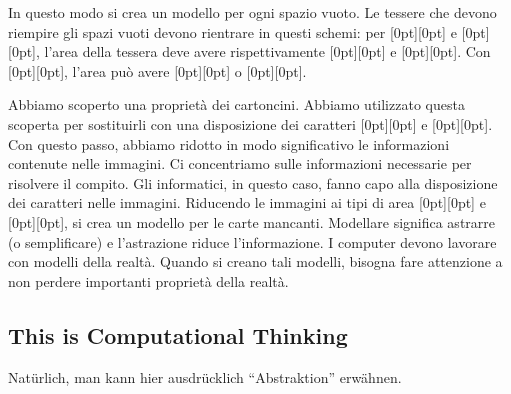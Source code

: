 \documentclass[a4paper,11pt]{report}
\newcommand{\taskGraphicsFolder}{..}
\begin{document}
In questo modo si crea un modello per ogni spazio vuoto. Le tessere che devono riempire gli spazi vuoti devono rientrare in questi schemi: per \raisebox{-0.5ex}[0pt][0pt]{} e \raisebox{-0.5ex}[0pt][0pt]{}, l’area della tessera deve avere rispettivamente \raisebox{-0.5ex}[0pt][0pt]{} e \raisebox{-0.5ex}[0pt][0pt]{}. Con \raisebox{-0.5ex}[0pt][0pt]{}, l’area può avere \raisebox{-0.5ex}[0pt][0pt]{} o \raisebox{-0.5ex}[0pt][0pt]{}.

Abbiamo scoperto una proprietà dei cartoncini. Abbiamo utilizzato questa scoperta per sostituirli con una disposizione dei caratteri \raisebox{-0.5ex}[0pt][0pt]{} e \raisebox{-0.5ex}[0pt][0pt]{}. Con questo passo, abbiamo ridotto in modo significativo le informazioni contenute nelle immagini. Ci concentriamo sulle informazioni necessarie per risolvere il compito. Gli informatici, in questo caso, fanno capo alla disposizione dei caratteri nelle immagini. Riducendo le immagini ai tipi di area \raisebox{-0.5ex}[0pt][0pt]{} e \raisebox{-0.5ex}[0pt][0pt]{}, si crea un modello per le carte mancanti. Modellare significa astrarre (o semplificare) e l’astrazione riduce l’informazione. I computer devono lavorare con modelli della realtà. Quando si creano tali modelli, bisogna fare attenzione a non perdere importanti proprietà della realtà.


\subsection*{This is Computational Thinking}

Natürlich, man kann hier ausdrücklich \enquote{Abstraktion} erwähnen.
\end{document}
